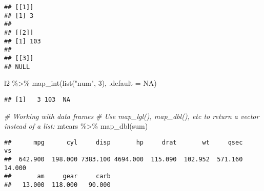 \documentclass[
]{book}
\newenvironment{Shaded}{\begin{snugshade}}{\end{snugshade}}
\newcommand{\AttributeTok}[1]{\textcolor[rgb]{0.77,0.63,0.00}{#1}}
\newcommand{\CommentTok}[1]{\textcolor[rgb]{0.56,0.35,0.01}{\textit{#1}}}
\newcommand{\ConstantTok}[1]{\textcolor[rgb]{0.00,0.00,0.00}{#1}}
\newcommand{\DecValTok}[1]{\textcolor[rgb]{0.00,0.00,0.81}{#1}}
\newcommand{\FunctionTok}[1]{\textcolor[rgb]{0.00,0.00,0.00}{#1}}
\newcommand{\NormalTok}[1]{#1}
\newcommand{\SpecialCharTok}[1]{\textcolor[rgb]{0.00,0.00,0.00}{#1}}
\newcommand{\StringTok}[1]{\textcolor[rgb]{0.31,0.60,0.02}{#1}}
\begin{document}
\begin{verbatim}
## [[1]]
## [1] 3
## 
## [[2]]
## [1] 103
## 
## [[3]]
## NULL
\end{verbatim}

\begin{Shaded}
\begin{Highlighting}[]
\NormalTok{l2 }\SpecialCharTok{\%\textgreater{}\%} 
  \FunctionTok{map\_int}\NormalTok{(}\FunctionTok{list}\NormalTok{(}\StringTok{"num"}\NormalTok{, }\DecValTok{3}\NormalTok{), }\AttributeTok{.default =} \ConstantTok{NA}\NormalTok{)}
\end{Highlighting}
\end{Shaded}

\begin{verbatim}
## [1]   3 103  NA
\end{verbatim}

\begin{Shaded}
\begin{Highlighting}[]
\CommentTok{\# Working with data frames}
\CommentTok{\# Use map\_lgl(), map\_dbl(), etc to return a vector instead of a list:}
\NormalTok{mtcars }\SpecialCharTok{\%\textgreater{}\%} 
  \FunctionTok{map\_dbl}\NormalTok{(sum)}
\end{Highlighting}
\end{Shaded}

\begin{verbatim}
##      mpg      cyl     disp       hp     drat       wt     qsec       vs 
##  642.900  198.000 7383.100 4694.000  115.090  102.952  571.160   14.000 
##       am     gear     carb 
##   13.000  118.000   90.000
\end{verbatim}

\begin{Shaded}
\end{Shaded}
\end{document}
